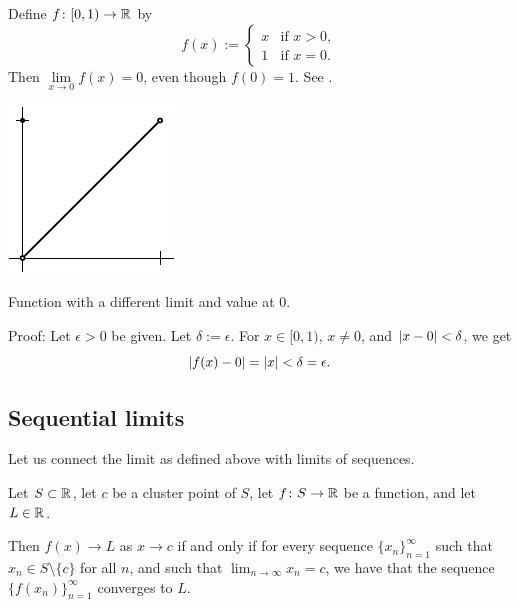 \begin{example}
Define $f \colon [0,1) \to {\mathbb{R}}$ by
\begin{equation*}
f(x) := 
\begin{cases}
x & \text{if } x > 0 , \\
1 & \text{if } x = 0 .
\end{cases}
\end{equation*}
Then
$\lim\limits_{x\to 0} f(x) = 0$,
even though $f(0) = 1$.  See .
\begin{myfigureht}
\includegraphics{figures/limvaldiff}
\caption{Function with a different limit and value at $0$.\label{fig:limvaldiff}}
\end{myfigureht}

Proof:  Let $\epsilon > 0$ be given.  Let $\delta := \epsilon$.
For $x \in [0,1)$, $x \not= 0$, and $\left\lvert {x-0} \right\rvert < \delta$, we get
\begin{equation*}
\left\lvert {f(x) - 0} \right\rvert = \left\lvert {x} \right\rvert < \delta = \epsilon .
\end{equation*}
\end{example}

\subsection{Sequential limits} \label{subseq:sequentiallimits}

Let us connect the limit as defined above with limits of sequences.

\begin{lemma}\label{seqflimit:lemma}
Let $S \subset {\mathbb{R}}$, let $c$ be a cluster point of $S$, let $f \colon S \to
{\mathbb{R}}$ be a function, and let $L \in {\mathbb{R}}$.

Then
$f(x) \to L$ as $x \to c$ if and only if for every sequence
$\{ x_n \}_{n=1}^\infty$
such that $x_n \in S \setminus \{c\}$ for all $n$,
and such that $\lim_{n\to\infty} x_n = c$,
we have that the sequence $\bigl\{ f(x_n) \bigr\}_{n=1}^\infty$ converges to $L$.
\end{lemma}

